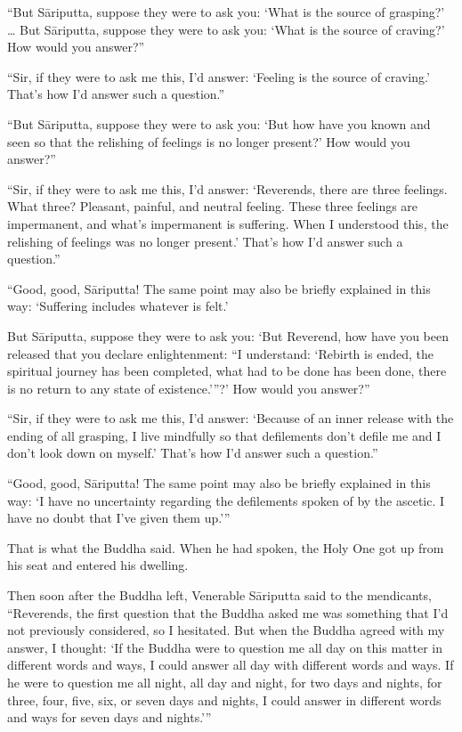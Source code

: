 \documentclass[12pt,openany]{book}%
\begin{document}
“But \textsanskrit{Sāriputta}, suppose they were to ask you: ‘What is the source of grasping?’ … But \textsanskrit{Sāriputta}, suppose they were to ask you: ‘What is the source of craving?’ How would you answer?” 

“Sir, if they were to ask me this, I’d answer: ‘Feeling is the source of craving.’ That’s how I’d answer such a question.” 

“But \textsanskrit{Sāriputta}, suppose they were to ask you: ‘But how have you known and seen so that the relishing of feelings is no longer present?’ How would you answer?” 

“Sir, if they were to ask me this, I’d answer: ‘Reverends, there are three feelings. What three? Pleasant, painful, and neutral feeling. These three feelings are impermanent, and what’s impermanent is suffering. When I understood this, the relishing of feelings was no longer present.’ That’s how I’d answer such a question.” 

“Good, good, \textsanskrit{Sāriputta}! The same point may also be briefly explained in this way: ‘Suffering includes whatever is felt.’ 

But \textsanskrit{Sāriputta}, suppose they were to ask you: ‘But Reverend, how have you been released that you declare enlightenment: “I understand: ‘Rebirth is ended, the spiritual journey has been completed, what had to be done has been done, there is no return to any state of existence.’”?’ How would you answer?” 

“Sir, if they were to ask me this, I’d answer: ‘Because of an inner release with the ending of all grasping, I live mindfully so that defilements don’t defile me and I don’t look down on myself.’ That’s how I’d answer such a question.” 

“Good, good, \textsanskrit{Sāriputta}! The same point may also be briefly explained in this way: ‘I have no uncertainty regarding the defilements spoken of by the ascetic. I have no doubt that I’ve given them up.’” 

That is what the Buddha said. When he had spoken, the Holy One got up from his seat and entered his dwelling. 

Then soon after the Buddha left, Venerable \textsanskrit{Sāriputta} said to the mendicants, “Reverends, the first question that the Buddha asked me was something that I’d not previously considered, so I hesitated. But when the Buddha agreed with my answer, I thought: ‘If the Buddha were to question me all day on this matter in different words and ways, I could answer all day with different words and ways. If he were to question me all night, all day and night, for two days and nights, for three, four, five, six, or seven days and nights, I could answer in different words and ways for seven days and nights.’” 
\end{document}
